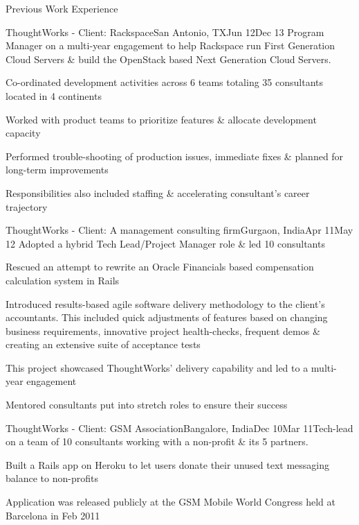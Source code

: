 \documentclass{resume} %
\begin{document}
\begin{rSection}{Previous Work Experience}
\begin{rSubsection}{ThoughtWorks - Client: Rackspace}{San Antonio, TX}{Jun
    12}{Dec 13}
{Program Manager on a multi-year engagement to help Rackspace run
  First Generation Cloud Servers \& build the OpenStack based Next
  Generation Cloud Servers.}

\item Co-ordinated development activities across 6 teams
  totaling 35 consultants located in 4 continents
\item Worked with product teams to prioritize features \& allocate development capacity
\item Performed trouble-shooting of production issues, immediate fixes \& planned for long-term improvements
\item Responsibilities also included staffing \& accelerating consultant's career trajectory
\end{rSubsection}


\begin{rSubsection}{ThoughtWorks - Client: A management consulting
    firm}{Gurgaon, India}{Apr 11}{May 12}
  {Adopted a hybrid Tech Lead/Project Manager role \& led 10 consultants}

\item Rescued an attempt to rewrite an Oracle Financials based compensation calculation system in Rails
\item Introduced results-based agile software delivery
  methodology to the client's accountants. This included quick
  adjustments of features based on changing business requirements, innovative
  project health-checks, frequent demos \& creating an extensive suite
  of acceptance tests
\item This project showcased ThoughtWorks' delivery capability and led to a multi-year engagement
\item Mentored consultants put into stretch roles to ensure their
  success
\end{rSubsection}


\begin{rSubsection}{ThoughtWorks - Client: GSM Association}{Bangalore, India}{Dec 10}{Mar 11}{Tech-lead on a team of 10 consultants working with a non-profit
  \& its 5 partners. }
\item Built a Rails app on Heroku to let users donate their unused text messaging balance to non-profits
\item Application was released publicly at the GSM Mobile World Congress held at Barcelona in Feb 2011
\end{rSubsection}



\end{rSection}
\end{document}
